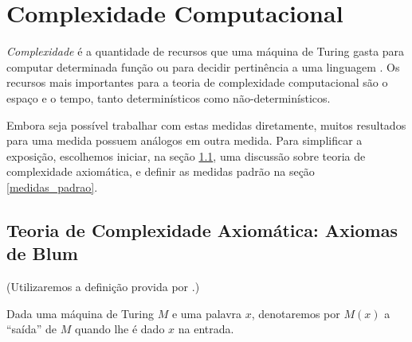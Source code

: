 \chapter{Complexidade Computacional}

\newcommand{\PhiDT}{{\mathcal{T}}} %
\newcommand{\PhiDS}{{\mathcal{S}}} %
\newcommand{\PhiNT}{{\mathcal{N\!T}}} %
\newcommand{\PhiNS}{{\mathcal{N\!S}}} %

\emph{Complexidade} é a quantidade de recursos
que uma máquina de Turing gasta
para computar determinada função
ou para decidir pertinência a uma linguagem
\cite[p. 285]{HopcroftUllman1979}.
Os recursos mais importantes para a teoria de complexidade computacional
são o espaço e o tempo,
tanto determinísticos como não-determinísticos.

Embora seja possível trabalhar com estas medidas diretamente,
muitos resultados para uma medida
possuem análogos em outra medida.
Para simplificar a exposição,
escolhemos iniciar,
na seção \ref{axiomas_blum},
uma discussão sobre teoria de complexidade axiomática,
e definir as medidas padrão na seção \ref{medidas_padrao}.

\section{Teoria de Complexidade Axiomática: Axiomas de Blum}
\label{axiomas_blum}

(Utilizaremos a definição provida por
.)

Dada uma máquina de Turing $M$
e uma palavra $x$,
denotaremos por $M(x)$ a ``saída''
de $M$ quando lhe é dado $x$ na entrada.

